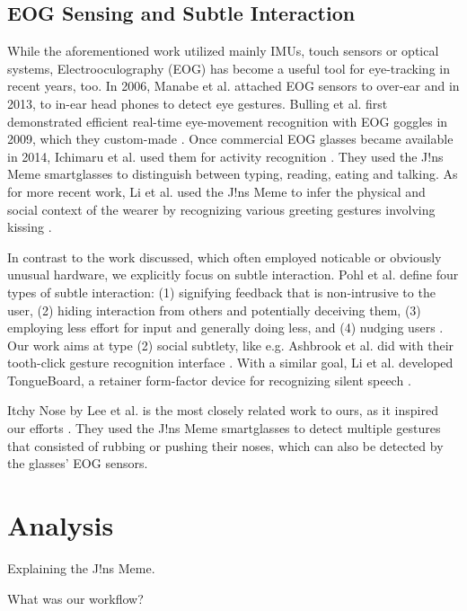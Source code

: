\documentclass[runningheads]{llncs}
\begin{document}
\subsection{EOG Sensing and Subtle Interaction}
While the aforementioned work utilized mainly IMUs, touch sensors or optical systems,
Electrooculography (EOG) has become a useful tool for eye-tracking in recent years, too. 
In 2006, Manabe et al. attached EOG sensors to over-ear \cite{10.1145/1125451.1125655}
and in 2013, to in-ear head phones \cite{10.1145/2493988.2494329} to detect eye gestures.
Bulling et al. first demonstrated efficient real-time eye-movement recognition
with EOG goggles in 2009, which they custom-made \cite{10.1145/1520340.1520468}.
Once commercial EOG glasses became available in 2014, Ichimaru et al. used them for
activity recognition \cite{10.1145/2638728.2638795}. They used the J!ns Meme
smartglasses to distinguish between typing, reading, eating and talking.
As for more recent work, Li et al. used the J!ns Meme to infer the physical and social
context of the wearer by recognizing various greeting gestures involving kissing
\cite{10.1145/3384657.3384801}.

In contrast to the work discussed, which often employed noticable or obviously unusual
hardware, we explicitly focus on subtle interaction. Pohl et al. define
four types of subtle interaction: (1) signifying feedback that is non-intrusive to the
user, (2) hiding interaction from others and potentially deceiving them, (3) employing
less effort for input and generally doing less, and (4) nudging users
\cite{10.1145/3290605.3300648}. Our work aims at type (2) social subtlety, like e.g.
Ashbrook et al. did with their tooth-click gesture recognition interface
\cite{10.1145/2935334.2935389}. With a similar goal, Li et al. developed TongueBoard,
a retainer form-factor device for recognizing silent speech \cite{10.1145/3311823.3311831}.

Itchy Nose by Lee et al. is the most closely related work to ours,
as it inspired our efforts \cite{10.1145/3123021.3123060}. They used the J!ns Meme
smartglasses to detect multiple gestures that consisted of rubbing or pushing their
noses, which can also be detected by the glasses' EOG sensors.

\section{Analysis}
Explaining the J!ns Meme.

What was our workflow?
\end{document}
